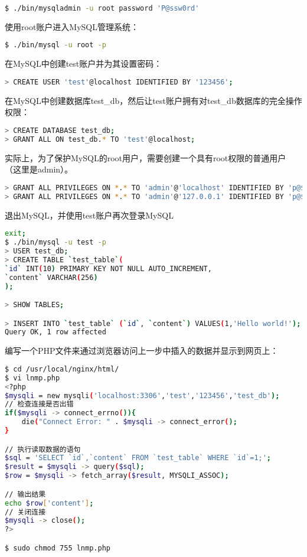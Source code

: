 \begin{lstlisting}[language=bash]
$ ./bin/mysqladmin -u root password 'P@ssw0rd'
\end{lstlisting}

使用root账户进入MySQL管理系统：

\begin{lstlisting}[language=bash]
$ ./bin/mysql -u root -p
\end{lstlisting}

在MySQL中创建test账户并为其设置密码：

\begin{lstlisting}[language=bash]
> CREATE USER 'test'@localhost IDENTIFIED BY '123456';
\end{lstlisting}

在MySQL中创建数据库test\_db，然后让test账户拥有对test\_db数据库的完全操作权限：


\begin{lstlisting}[language=bash]
> CREATE DATABASE test_db;
> GRANT ALL ON test_db.* TO 'test'@localhost;
\end{lstlisting}

实际上，为了保护MySQL的root用户，需要创建一个具有root权限的普通用户（这里是admin）。


\begin{lstlisting}[language=bash]
> GRANT ALL PRIVILEGES ON *.* TO 'admin'@'localhost' IDENTIFIED BY 'p@$$word';
> GRANT ALL PRIVILEGES ON *.* TO 'admin'@'127.0.0.1' IDENTIFIED BY 'p@$$word';
\end{lstlisting}




退出MySQL，并使用test账户再次登录MySQL

\begin{lstlisting}[language=bash]
exit;
$ ./bin/mysql -u test -p
> USER test_db;
> CREATE TABLE `test_table`(
`id` INT(10) PRIMARY KEY NOT NULL AUTO_INCREMENT,
`content` VARCHAR(256)
);

> SHOW TABLES;

> INSERT INTO `test_table` (`id`, `content`) VALUES(1,'Hello world!');
Query OK, 1 row affected
\end{lstlisting}

编写一个PHP文件来通过浏览器访问上一步中插入的数据并显示到网页上：


\begin{lstlisting}[language=bash]
$ cd /usr/local/nginx/html/
$ vi lnmp.php
<?php
$mysqli = new mysqli('localhost:3306','test','123456','test_db');
// 检查连接是否出错
if($mysqli -> connect_errno()){
	die("Connect Error: " . $mysqli -> connect_error();
}

// 执行读取数据的语句
$sql = 'SELECT `id`,`content` FROM `test_table` WHERE `id`=1;';
$result = $mysqli -> query($sql);
$row = $mysqli -> fetch_array($result, MYSQLI_ASSOC);

// 输出结果
echo $row['content'];
// 关闭连接
$mysqli -> close();
?>

$ sudo chmod 755 lnmp.php
\end{lstlisting}

